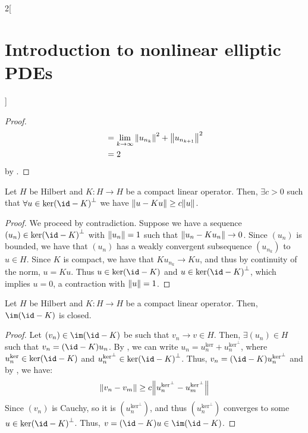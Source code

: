 \documentclass[../../../main_math.tex]{subfiles}
\begin{document}
\begin{multicols}{2}[\section{Introduction to nonlinear elliptic PDEs}]
\begin{proof}
\begin{align*}
        & =\lim_{k\to\infty}\norm{u_{n_k}}^2+\norm{u_{n_{k+1}}}^2 \\
        & =2
    \end{align*}
    by .
  \end{proof}
  \begin{lemma}\label{INEPDE:lemma2_fredholm}
    Let $H$ be Hilbert and $K:H\to H$ be a compact linear operator. Then, $\exists c>0$ such that $\forall u\in {\ker(\id-K)}^{\perp}$ we have $\norm{u-Ku}\geq c\norm{u}$.
  \end{lemma}
  \begin{proof}
    We proceed by contradiction. Suppose we have a sequence $(u_n)\in {\ker(\id-K)}^{\perp}$ with $\norm{u_n}=1$ such that $\norm{u_n-Ku_n}\to 0$. Since $(u_n)$ is bounded, we have that $(u_n)$ has a weakly convergent subsequence $(u_{n_k})$ to $u\in H$. Since $K$ is compact, we have that $Ku_{n_k}\to Ku$, and thus by continuity of the norm, $u=Ku$. Thus $u\in \ker(\id-K)$ and $u\in {\ker(\id-K)}^{\perp}$, which implies $u=0$, a contraction with $\norm{u}=1$.
  \end{proof}
  \begin{lemma}\label{INEPDE:lemma3_fredholm}
    Let $H$ be Hilbert and $K:H\to H$ be a compact linear operator. Then, $\im(\id-K)$ is closed.
  \end{lemma}
  \begin{proof}
    Let $(v_n)\in \im(\id-K)$ be such that $v_n\to v\in H$. Then, $\exists (u_n)\in H$ such that $v_n=(\id-K)u_n$. By , we can write $u_n=u_n^{\text{ker}}+ u_n^{\text{ker}^\perp}$, where $u_n^{\text{ker}}\in \ker(\id-K)$ and $u_n^{\text{ker}^\perp}\in {\ker(\id-K)}^{\perp}$. Thus, $v_n=(\id-K)u_n^{\text{ker}^\perp}$ and by , we have:
    $$
      \norm{v_n-v_m}\geq c\norm{u_n^{\text{ker}^\perp}-u_m^{\text{ker}^\perp}}
    $$
    Since $(v_n)$ is Cauchy, so it is $(u_n^{\text{ker}^\perp})$, and thus $(u_n^{\text{ker}^\perp})$ converges to some $u\in {\ker(\id-K)}^{\perp}$. Thus, $v=(\id-K)u\in \im(\id-K)$.
  \end{proof}

\end{multicols}
\end{document}
